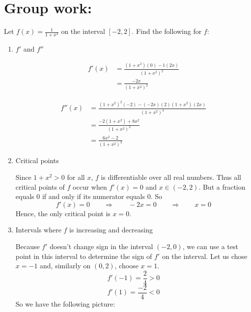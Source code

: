 \documentclass[nooutcomes]{ximera}
\begin{document}
	
	
	
	
	

\section*{Group work:}



\begin{problem}
Let $f(x) = \frac{1}{1 + x^2}$ on the interval $[-2,2]$.  Find the following for $f$:

	\begin{enumerate}
	
	\item  $f'$ and $f''$
	
		\begin{freeResponse}
			\begin{align*}
			f'(x) &= \frac{(1+x^2)(0) - 1(2x)}{(1+x^2)^2} \\
			&= \frac{-2x}{(1+x^2)^2}
			\end{align*}
			
			\begin{align*}
			f''(x) &= \frac{(1+x^2)^2(-2) - (-2x)(2)(1+x^2)(2x)}{(1+x^2)^4} \\
			&= \frac{-2(1+x^2) + 8x^2}{(1+x^2)^3} \\
			&= \frac{6x^2 - 2}{(1+x^2)^3}
			\end{align*}
		\end{freeResponse}
		
	\item  Critical points
	
		\begin{freeResponse}
		Since $1+x^2 > 0$ for all $x$, $f$ is differentiable over all real numbers.  Thus all critical points of $f$ occur when $f'(x) = 0$ and $x \in (-2,2)$.  But a fraction equals 0 if and only if its numerator equals 0.  So
		$$ f'(x) = 0 \qquad \Longrightarrow \qquad -2x = 0 \qquad \Longrightarrow \qquad x=0 $$
		Hence, the only critical point is $x=0$.  
		\end{freeResponse}
		
	\item  Intervals where $f$ is increasing and decreasing
	
		\begin{freeResponse}
		Because $f'$ doesn’t change sign in the interval $(-2,0)$, we can use a test point in this interval to determine the sign of $f'$ on the interval.  Let us chose $x=-1$ and, similarly on $(0,2)$, choose $x=1$.
		$$ f'(-1) = \frac{2}{4} > 0 $$
		$$ f'(1) = \frac{-2}{4} < 0 $$
		So we have the following picture:
		

\end{freeResponse}
\end{enumerate}
\end{problem}
\end{document}
